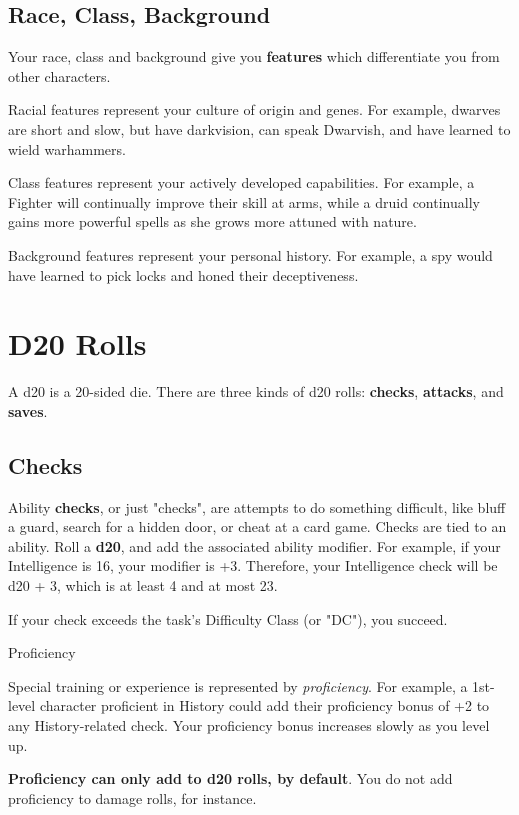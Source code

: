 \documentclass[letterpaper,twocolumn,openany,nodeprecatedcode,bg=print]{dndbook}
\begin{document}
\subsection{Race, Class, Background}
Your race, class and background give you \textbf{features} which differentiate you from other characters. 

Racial features represent your culture of origin and genes. 
For example, dwarves are short and slow, but have darkvision, can speak Dwarvish, and have learned to wield warhammers. 

Class features represent your actively developed capabilities. 
For example, a Fighter will continually improve their skill at arms, 
while a druid continually gains more powerful spells as she grows more attuned with nature. 

Background features represent your personal history. 
For example, a spy would have learned to pick locks and honed their deceptiveness.


\newpage
\section{D20 Rolls}

A d20 is a 20-sided die. 
There are three kinds of d20 rolls: \textbf{checks}, \textbf{attacks}, and \textbf{saves}.

\subsection{Checks}
Ability \textbf{checks}, or just "checks", are attempts to do something difficult, 
like bluff a guard, search for a hidden door, or cheat at a card game. 
Checks are tied to an ability. 
Roll a \textbf{d20}, and add the associated ability modifier. 
For example, if your Intelligence is 16, your modifier is +3. 
Therefore, your Intelligence check will be d20 + 3, which is at least 4 and at most 23.

If your check exceeds the task's Difficulty Class (or "DC"), you succeed.

\begin{DndComment}{Proficiency}

\noindent Special training or experience is represented by \textit{proficiency}. 
For example, a 1st-level character proficient in History could add their proficiency bonus of +2 to any History-related check. 
Your proficiency bonus increases slowly as you level up.

\textbf{Proficiency can only add to d20 rolls, by default}. 
You do not add proficiency to damage rolls, for instance.

\end{DndComment}
\end{document}
